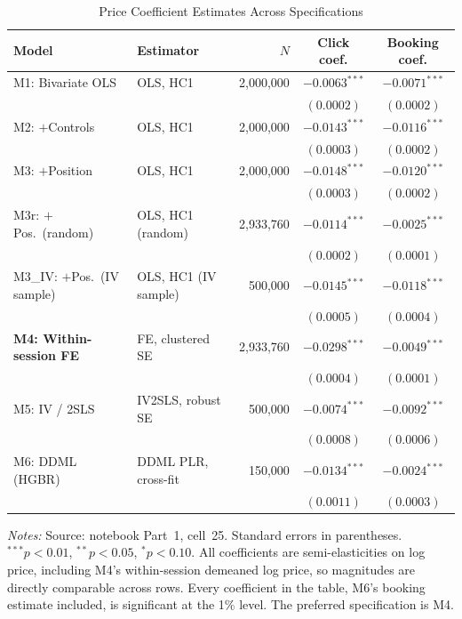\documentclass[11pt]{article}
\begin{document}
\begin{table}[htbp]
  \centering
  \caption{Price Coefficient Estimates Across Specifications}
  \label{tab:regression}
  \small
  \begin{tabular}{llrcc}
    \toprule
    Model & Estimator & $N$ & Click coef. & Booking coef. \\
    \midrule
    M1: Bivariate OLS      & OLS, HC1              & 2,000,000 & $-0.0063^{***}$ & $-0.0071^{***}$ \\
                           &                       &           & $(0.0002)$ & $(0.0002)$ \\
    M2: $+$Controls        & OLS, HC1              & 2,000,000 & $-0.0143^{***}$ & $-0.0116^{***}$ \\
                           &                       &           & $(0.0003)$ & $(0.0002)$ \\
    M3: $+$Position        & OLS, HC1              & 2,000,000 & $-0.0148^{***}$ & $-0.0120^{***}$ \\
                           &                       &           & $(0.0003)$ & $(0.0002)$ \\
    M3r: $+$Pos.\ (random) & OLS, HC1 (random)     & 2,933,760 & $-0.0114^{***}$ & $-0.0025^{***}$ \\
                           &                       &           & $(0.0002)$ & $(0.0001)$ \\
    M3\_IV: $+$Pos.\ (IV sample) & OLS, HC1 (IV sample) & 500,000 & $-0.0145^{***}$ & $-0.0118^{***}$ \\
                           &                       &           & $(0.0005)$ & $(0.0004)$ \\
    \textbf{M4: Within-session FE} & FE, clustered SE & 2,933,760 & $\mathbf{-0.0298^{***}}$ & $\mathbf{-0.0049^{***}}$ \\
                           &                       &           & $(0.0004)$ & $(0.0001)$ \\
    M5: IV / 2SLS          & IV2SLS, robust SE     & 500,000   & $-0.0074^{***}$ & $-0.0092^{***}$ \\
                           &                       &           & $(0.0008)$ & $(0.0006)$ \\
    M6: DDML (HGBR)        & DDML PLR, cross-fit   & 150,000   & $-0.0134^{***}$ & $-0.0024^{***}$ \\
                           &                       &           & $(0.0011)$ & $(0.0003)$ \\
    \bottomrule
  \end{tabular}
  \vspace{0.6ex}
  \begin{minipage}{0.95\textwidth}
  \footnotesize \textit{Notes:} Source: notebook Part~1, cell~25. Standard
  errors in parentheses. $^{***}p<0.01$, $^{**}p<0.05$, $^{*}p<0.10$. All
  coefficients are semi-elasticities on log price, including M4's
  within-session demeaned log price, so magnitudes are directly comparable
  across rows. Every coefficient in the table, M6's booking estimate included,
  is significant at the 1\% level. The preferred specification is M4.
  \end{minipage}
\end{table}
\end{document}
